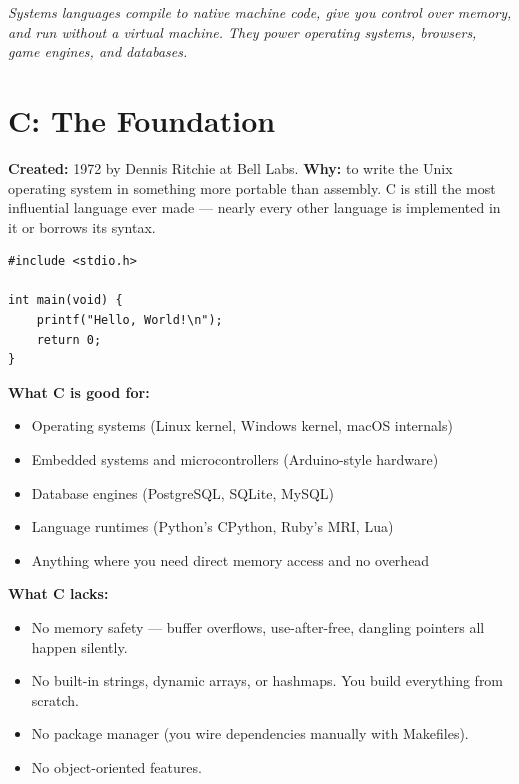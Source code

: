 \documentclass[11pt, letterpaper]{article}
\begin{document}
\vspace{6pt}
\begin{center}\small\itshape
  Systems languages compile to native machine code, give you control over memory,
  and run without a virtual machine. They power operating systems, browsers, game engines, and databases.
\end{center}

\section*{C: The Foundation}

\textbf{Created:} 1972 by Dennis Ritchie at Bell Labs. \textbf{Why:} to write the Unix operating system in something more portable than assembly. C is still the most influential language ever made --- nearly every other language is implemented in it or borrows its syntax.

\begin{lstlisting}[style=code, caption={C: minimal hello world}]
#include <stdio.h>

int main(void) {
    printf("Hello, World!\n");
    return 0;
}
\end{lstlisting}

\textbf{What C is good for:}
\begin{itemize}[noitemsep]
  \item Operating systems (Linux kernel, Windows kernel, macOS internals)
  \item Embedded systems and microcontrollers (Arduino-style hardware)
  \item Database engines (PostgreSQL, SQLite, MySQL)
  \item Language runtimes (Python's CPython, Ruby's MRI, Lua)
  \item Anything where you need direct memory access and no overhead
\end{itemize}

\textbf{What C lacks:}
\begin{itemize}[noitemsep]
  \item No memory safety --- buffer overflows, use-after-free, dangling pointers all happen silently.
  \item No built-in strings, dynamic arrays, or hashmaps. You build everything from scratch.
  \item No package manager (you wire dependencies manually with Makefiles).
  \item No object-oriented features.
\end{itemize}
\end{document}
